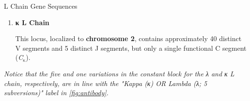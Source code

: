 \begin{core}[label=core:l_chain_gene]{L Chain Gene Sequences}
\begin{enumerate}
          This gene family, localized to \textbf{chromosome 22}, is organized as a series of 30 leader (L) and variable (V) segments followed by a series of joining (J) and constant (C) segments. It comprises approximately 30 to 40 distinct V segments and 5 distinct J segments, along with 5 C segments in total; of these, only two (\textit{C$_\text{λ}$1 and C$_\text{λ}$2}) are functional exons, while the remaining three (\textit{C$_\text{λ}$3, C$_\text{λ}$4, and C$_\text{λ}$5}) are \textbf{pseudogenes}, meaning the region is incapable of coding for a protein.

        \item \textbf{κ L Chain}

          \vspace{-0.4cm}

          This locus, localized to \textbf{chromosome 2}, contains approximately 40 distinct V segments and 5 distinct J segments, but only a single functional C segment (\textit{C$_\text{κ}$}).

      \end{enumerate}

      \textit{Notice that the five and one variations in the constant block for the λ and κ L chain, respectively, are in line with the "Kappa (κ) OR Lambda (λ; 5 subversions)" label in \autoref{fig:antibody}.}



\end{core}
